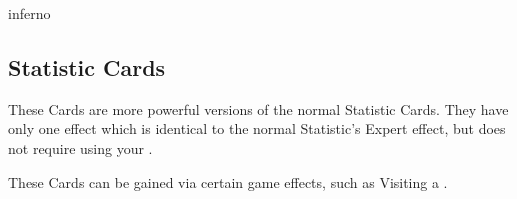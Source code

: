 \begin{multicols}{2}
\begin{expansion}[before=\vspace*{-2em}]{inferno}
    \subsection*{ Statistic Cards}
    These Cards are more powerful versions of the normal Statistic Cards.
    They have only one effect which is identical to the normal Statistic's Expert effect, but does not require using your .\par

    \medskip
    These Cards can be gained via certain game effects, such as Visiting a .
\end{expansion}
\end{multicols}

